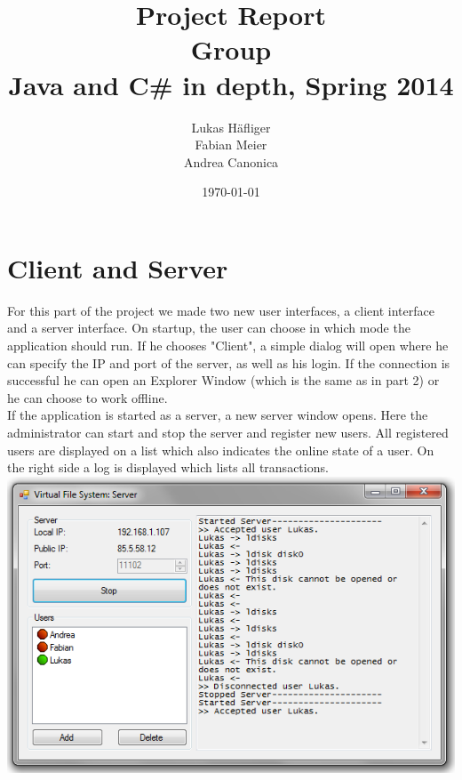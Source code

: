 \documentclass[a4paper,12pt]{article}
\title{
Project Report \\ 
Group \groupname \\
\vspace{5mm}
\large Java and C\# in depth, Spring 2014
}
\author{
Lukas Häfliger\\
Fabian Meier\\
Andrea Canonica
}
\date{\today}
\newcommand{\groupname}{Tortoise\xspace}
\begin{document}
\maketitle




\section{Client and Server}

For this part of the project we made two new user interfaces, a client interface and a server interface. On startup, the user can choose in which mode the application should run. If he chooses "Client", a simple dialog will open where he can specify the IP and port of the server, as well as his login. If the connection is successful he can open an Explorer Window (which is the same as in part 2) or he can choose to work offline. \\
If the application is started as a server, a new server window opens. Here the administrator can start and stop the server and register new users. All registered users are displayed on a list which also indicates the online state of a user. On the right side a log is displayed which lists all transactions. \\

\includegraphics[scale=0.8] {servergui}
\end{document}
